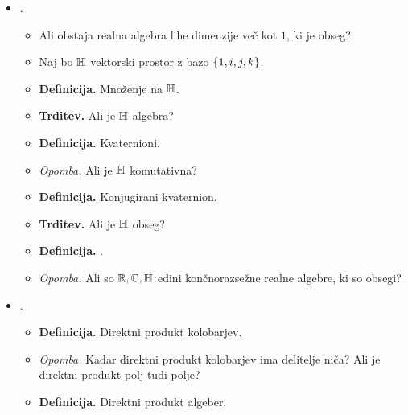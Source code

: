 \begin{enumerate}
\begin{itemize}
        \item {}.
        \begin{itemize}
            \item Ali obstaja realna algebra lihe dimenzije več kot $1$, ki je obseg?
            \item Naj bo $\mathbb{H}$ vektorski prostor z bazo $\left\{1, i, j, k\right\}$. 
            \item \colorbox{purple!30}{\textbf{Definicija.}} Množenje na $\mathbb{H}$.
            \item \colorbox{blue!30}{\textbf{Trditev.}} Ali je $\mathbb{H}$ algebra?
            \item \colorbox{purple!30}{\textbf{Definicija.}} Kvaternioni.
            \item \colorbox{yellow!30}{\emph{Opomba.}} Ali je $\mathbb{H}$ komutativna?
            \item \colorbox{purple!30}{\textbf{Definicija.}} Konjugirani kvaternion.
            \item \colorbox{blue!30}{\textbf{Trditev.}} Ali je $\mathbb{H}$ obseg?
            \item \colorbox{purple!30}{\textbf{Definicija.}} .
            \item \colorbox{yellow!30}{\emph{Opomba.}} Ali so $\mathbb{R}, \mathbb{C}, \mathbb{H}$ edini končnorazsežne realne algebre, ki so obsegi?
        \end{itemize}

        \item {}.
        \begin{itemize}
            \item \colorbox{purple!30}{\textbf{Definicija.}} Direktni produkt kolobarjev.
            \item \colorbox{yellow!30}{\emph{Opomba.}} Kadar direktni produkt kolobarjev ima delitelje niča? Ali je direktni produkt polj tudi polje?
            \item \colorbox{purple!30}{\textbf{Definicija.}} Direktni produkt algeber.
        \end{itemize}
    \end{itemize}


\end{enumerate}
